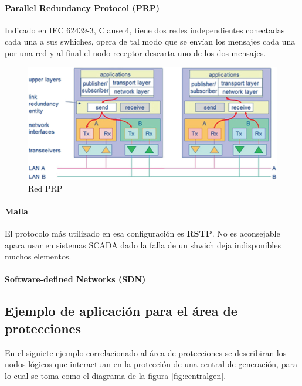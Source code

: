 \documentclass[a5paper]{book}%
\begin{document}
\paragraph{Parallel Redundancy Protocol (PRP)}

Indicado en IEC 62439-3, Clause 4, tiene dos redes independientes conectadas cada una a sus swhiches, opera de tal modo que se envían los mensajes cada una por una red y al final  el nodo receptor descarta uno de los dos mensajes.

\begin{figure}[H]
	\centering
	\caption{Red PRP}
	\label{fig:prp}
	\includegraphics[width=0.7\linewidth]{prp}
\end{figure}


\paragraph{Malla}

El protocolo más utilizado en esa configuración es \textbf{RSTP}. No es aconsejable apara usar en sistemas SCADA dado la falla de un shwich deja indisponibles  muchos elementos.

\paragraph{Software-defined Networks (SDN)}

\subsection{}

\subsection{Ejemplo de aplicación para el área de protecciones}

    En el siguiete ejemplo correlacionado al área de protecciones se describiran los nodos lógicos que interactuan en la protección de una central de generación, para lo cual se toma como el diagrama de la figura \ref{fig:centralgen}.
\end{document}
